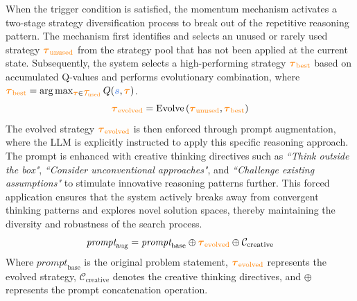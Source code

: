 \documentclass{article} %
\theoremstyle{definition}
\theoremstyle{remark}
\begin{document}
When the trigger condition is satisfied, the momentum mechanism activates a two-stage strategy diversification process to break out of the repetitive reasoning pattern. The mechanism first identifies and selects an unused or rarely used strategy $\textcolor{orange}{\boldsymbol{\tau}_{\text{unused}}}$ from the strategy pool that has not been applied at the current state. Subsequently, the system selects a high-performing strategy $\textcolor{orange}{\boldsymbol{\tau}_{\text{best}}}$ based on accumulated Q-values and performs evolutionary combination, where $\textcolor{orange}{\boldsymbol{\tau}_{\text{best}}} = \arg\max_{\textcolor{orange}{\boldsymbol{\tau}} \in \textcolor{orange}{\mathcal{T}_{\text{used}}}} Q(\textcolor{lightblue}{\boldsymbol{s}}, \textcolor{orange}{\boldsymbol{\tau}})$.
\begin{equation}
\textcolor{orange}{\boldsymbol{\tau}_{\text{evolved}}} = \text{Evolve}\left(\textcolor{orange}{\boldsymbol{\tau}_{\text{unused}}}, \textcolor{orange}{\boldsymbol{\tau}_{\text{best}}}\right)
\end{equation}
The evolved strategy $\textcolor{orange}{\boldsymbol{\tau}_{\text{evolved}}}$ is then enforced through prompt augmentation, where the LLM is explicitly instructed to apply this specific reasoning approach. The prompt is enhanced with creative thinking directives such as \textit{``Think outside the box"}, \textit{``Consider unconventional approaches"}, and \textit{``Challenge existing assumptions"} to stimulate innovative reasoning patterns further. This forced application ensures that the system actively breaks away from convergent thinking patterns and explores novel solution spaces, thereby maintaining the diversity and robustness of the search process.
\begin{equation}
\label{eq:augmented_prompt_v4}
\textit{prompt}_{\text{aug}} = \textit{prompt}_{\text{base}} \oplus \textcolor{orange}{\boldsymbol{\tau}_{\text{evolved}}}\oplus \mathcal{C}_{\text{creative}} 
\end{equation}
Where $\textit{prompt}_{\text{base}}$ is the original problem statement, $\textcolor{orange}{\boldsymbol{\tau}_{\text{evolved}}}$ represents the evolved strategy, $\mathcal{C}_{\text{creative}}$ denotes the creative thinking directives, and $\oplus$ represents the prompt concatenation operation.
\end{document}
